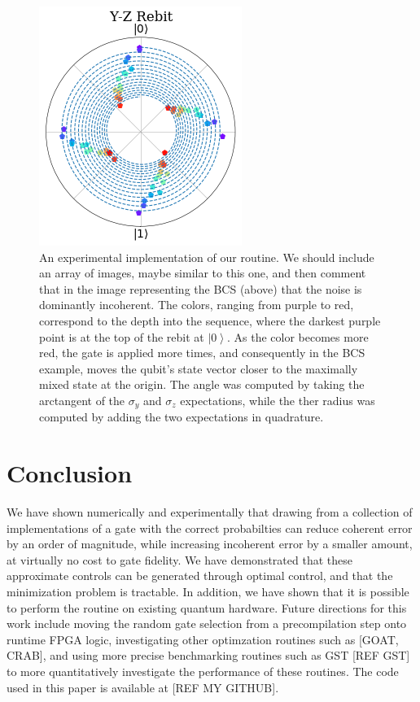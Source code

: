 \documentclass[aps,nofootinbib,pra,notitlepage,twocolumn]{revtex4-1}
\newcommand{\ket}[1]{\ensuremath{\left\vert{#1}\right\rangle}}
\begin{document}
\begin{figure}[H]
  \centering
  \includegraphics[width=.75\columnwidth]{example.png}
  \caption{An experimental implementation of our routine. We should include an array of images, maybe similar to this one, and then comment that in the image representing the BCS (above) that the noise is dominantly incoherent. The colors, ranging from purple to red, correspond to the depth into the sequence, where the darkest purple point is at the top of the rebit at $\ket{0}$. As the color becomes more red, the gate is applied more times, and consequently in the BCS example, moves the qubit's state vector closer to the maximally mixed state at the origin. The angle was computed by taking the arctangent of the $\sigma_y$ and $\sigma_z$ expectations, while the ther radius was computed by adding the two expectations in quadrature.}
  \label{fig:rebit}
\end{figure}

\section{Conclusion}
We have shown numerically and experimentally that drawing from a collection of implementations of a gate with the correct probabilties can reduce coherent error by an order of magnitude, while increasing incoherent error by a smaller amount, at virtually no cost to gate fidelity. We have demonstrated that these approximate controls can be generated through optimal control, and that the minimization problem is tractable. In addition, we have shown that it is possible to perform the routine on existing quantum hardware. Future directions for this work include moving the random gate selection from a precompilation step onto runtime FPGA logic, investigating other optimzation routines such as [GOAT, CRAB], and using more precise benchmarking routines such as GST [REF GST] to more quantitatively investigate the performance of these routines. The code used in this paper is available at [REF MY GITHUB].
\end{document}
